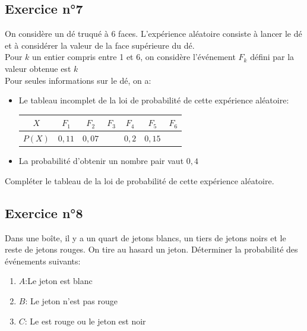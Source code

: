 \documentclass[12pt,a4paper]{article}
\begin{document}
\subsection*{Exercice n°7} 

On considère un dé truqué à 6 faces. L'expérience aléatoire consiste à lancer le dé et à considérer la valeur de la face supérieure du dé.\\
Pour $k$ un entier compris entre 1 et 6, on considère l'événement $F_k$ défini par \og la valeur obtenue est $k$ \fg{} \\
Pour seules informations sur le dé, on a:

\begin{itemize}
    \item Le tableau incomplet de la loi de probabilité de cette expérience aléatoire:


\begin{center}
 { \setlength{\tabcolsep}{8mm}
\begin{tabular}{|c|c|c|c|c|c|c|} \hline
 $X$& $F_1$ &$F_2$& $F_3$&$F_4$&$F_5$&$F_6$\\ \hline

$P(X)$& $0,11$& $0,07$& &$0,2$ &$0,15$ &\\ \hline

\end{tabular} }
   
\end{center}
\item La probabilité d'obtenir un nombre pair vaut $0,4$
\end{itemize}

Compléter le tableau de la loi de probabilité de cette expérience aléatoire.

\subsection*{Exercice n°8} 

Dans une boîte, il y a un quart de jetons blancs, un tiers de jetons noirs et le reste de jetons rouges. On tire au hasard un jeton. Déterminer la probabilité des événements suivants:

\begin{enumerate}
    \item $A$:\og Le jeton est blanc \fg{}
    \item $B$: \og Le jeton n'est pas rouge \fg{}
    \item $C$: \og Le est rouge ou le jeton est noir \fg{}
\end{enumerate}
\end{document}
